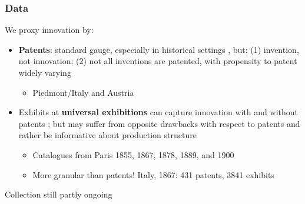 \documentclass[10pt]{beamer}
\begin{document}
    
\begin{frame}
    \frametitle{Data}
    
    We proxy innovation by:

    \begin{itemize}
        \item \textbf{Patents}: standard gauge, especially in historical settings \citep{streb2023}, but: (1) invention, not innovation; (2) not all inventions are patented, with propensity to patent widely varying \citep{griliches1990, nagaoka2010}
        
        \begin{itemize}
            \item Piedmont/Italy and Austria
        \end{itemize}

        \pause
        
        \item Exhibits at \textbf{universal exhibitions} can capture innovation with and without patents \citep{moser2005, moser2012}; but may suffer from opposite drawbacks with respect to patents and rather be informative about production structure \citep{domini2019, domini2022}
         
        \begin{itemize}
            \item Catalogues from Paris 1855, 1867, 1878, 1889, and 1900
            \item More granular than patents! Italy, 1867: 431 patents, 3841 exhibits 
        \end{itemize}

    \end{itemize}

    \bigskip
    Collection still partly ongoing
    
\end{frame}
\end{document}
